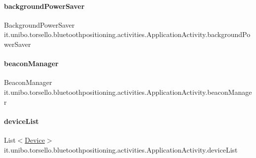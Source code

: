 \paragraph{\texorpdfstring{background\+Power\+Saver}{backgroundPowerSaver}}
{\footnotesize\ttfamily Background\+Power\+Saver it.\+unibo.\+torsello.\+bluetoothpositioning.\+activities.\+Application\+Activity.\+background\+Power\+Saver\hspace{0.3cm}{\ttfamily [private]}}

\hypertarget{classit_1_1unibo_1_1torsello_1_1bluetoothpositioning_1_1activities_1_1ApplicationActivity_a973c37226a3dbba6016966c3555aff65_a973c37226a3dbba6016966c3555aff65}{}\label{classit_1_1unibo_1_1torsello_1_1bluetoothpositioning_1_1activities_1_1ApplicationActivity_a973c37226a3dbba6016966c3555aff65_a973c37226a3dbba6016966c3555aff65} 
\paragraph{\texorpdfstring{beacon\+Manager}{beaconManager}}
{\footnotesize\ttfamily Beacon\+Manager it.\+unibo.\+torsello.\+bluetoothpositioning.\+activities.\+Application\+Activity.\+beacon\+Manager\hspace{0.3cm}{\ttfamily [private]}}

\hypertarget{classit_1_1unibo_1_1torsello_1_1bluetoothpositioning_1_1activities_1_1ApplicationActivity_ad146f35cfee210f7191442658a235a2f_ad146f35cfee210f7191442658a235a2f}{}\label{classit_1_1unibo_1_1torsello_1_1bluetoothpositioning_1_1activities_1_1ApplicationActivity_ad146f35cfee210f7191442658a235a2f_ad146f35cfee210f7191442658a235a2f} 
\paragraph{\texorpdfstring{device\+List}{deviceList}}
{\footnotesize\ttfamily List$<$\hyperlink{classit_1_1unibo_1_1torsello_1_1bluetoothpositioning_1_1model_1_1Device}{Device}$>$ it.\+unibo.\+torsello.\+bluetoothpositioning.\+activities.\+Application\+Activity.\+device\+List\hspace{0.3cm}{\ttfamily [private]}}

